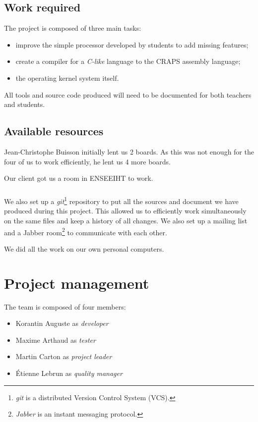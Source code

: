 \documentclass[openany, a4paper]{book}
\begin{document}
    \section{Work required}
      The project is composed of three main tasks:
      \begin{itemize}
        \item improve the simple processor developed by students to add missing
          features;
        \item create a compiler for a \textit{C-like} language to the CRAPS
          assembly language;
        \item the operating kernel system itself.
      \end{itemize}

      All tools and source code produced will need to be documented for both
      teachers and students.

    \section{Available resources}
      Jean-Christophe Buisson initially lent us 2 boards. As this was not enough
      for the four of us to work efficiently, he lent us 4 more boards.
      
      Our client got us a room in ENSEEIHT to work.

      \paragraph{}
      We also set up a \textit{git}\footnote{\textit{git} is a distributed
      Version Control System (VCS).} repository to put all the sources and
      document we have produced during this project. This allowed us to
      efficiently work simultaneously on the same files and keep a history of
      all changes.  We also set up a mailing list and a Jabber
      room\footnote{\textit{Jabber} is an instant messaging protocol.} to
      communicate with each other.

      We did all the work on our own personal computers.


  \chapter{Project management}
    The team is composed of four members:
    \begin{itemize}
      \item Korantin Auguste as \textit{developer}
      \item Maxime Arthaud as \textit{tester}
      \item Martin Carton as \textit{project leader}
      \item Étienne Lebrun as \textit{quality manager}
    \end{itemize}
\end{document}
